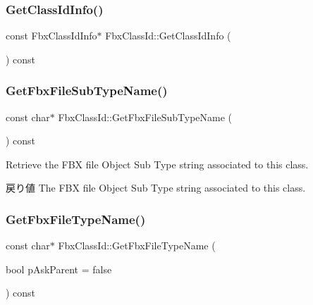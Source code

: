 \subsubsection{\texorpdfstring{Get\+Class\+Id\+Info()}{GetClassIdInfo()}\hspace{0.1cm}{\footnotesize\ttfamily [2/2]}}
{\footnotesize\ttfamily const Fbx\+Class\+Id\+Info$\ast$ Fbx\+Class\+Id\+::\+Get\+Class\+Id\+Info (\begin{DoxyParamCaption}{ }\end{DoxyParamCaption}) const}

\mbox{\label{class_fbx_class_id_a2aa9a15c83252c28a9ffd01366e9348b}} 
\subsubsection{\texorpdfstring{Get\+Fbx\+File\+Sub\+Type\+Name()}{GetFbxFileSubTypeName()}}
{\footnotesize\ttfamily const char$\ast$ Fbx\+Class\+Id\+::\+Get\+Fbx\+File\+Sub\+Type\+Name (\begin{DoxyParamCaption}{ }\end{DoxyParamCaption}) const}

Retrieve the F\+BX file Object Sub Type string associated to this class. \begin{DoxyReturn}{戻り値}
The F\+BX file Object Sub Type string associated to this class. 
\end{DoxyReturn}
\mbox{\label{class_fbx_class_id_ac1cca09d096f3f65f6df0f03d4ce7e39}} 
\subsubsection{\texorpdfstring{Get\+Fbx\+File\+Type\+Name()}{GetFbxFileTypeName()}}
{\footnotesize\ttfamily const char$\ast$ Fbx\+Class\+Id\+::\+Get\+Fbx\+File\+Type\+Name (\begin{DoxyParamCaption}\item[{bool}]{p\+Ask\+Parent = {\ttfamily false} }\end{DoxyParamCaption}) const}

